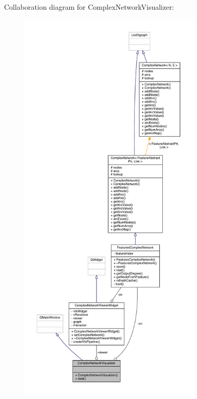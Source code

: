 Collaboration diagram for Complex\+Network\+Visualizer\+:
\nopagebreak
\begin{figure}[H]
\begin{center}
\leavevmode
\includegraphics[height=550pt]{class_complex_network_visualizer__coll__graph}
\end{center}
\end{figure}


